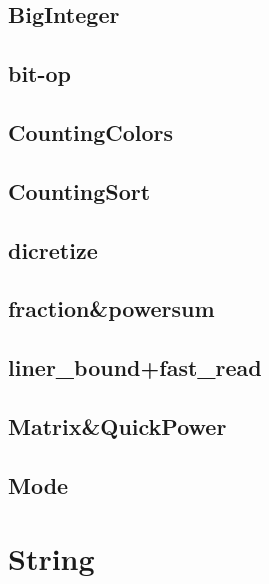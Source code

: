\subsection{BigInteger}
\raggedbottom
\hrulefill
\subsection{bit-op}
\raggedbottom
\hrulefill
\subsection{CountingColors}
\raggedbottom
\hrulefill
\subsection{CountingSort}
\raggedbottom
\hrulefill
\subsection{dicretize}
\raggedbottom
\hrulefill
\subsection{fraction\&powersum}
\raggedbottom
\hrulefill
\subsection{liner\_bound+fast\_read}
\raggedbottom
\hrulefill
\subsection{Matrix\&QuickPower}
\raggedbottom
\hrulefill
\subsection{Mode}
\raggedbottom
\hrulefill

\section{String}
